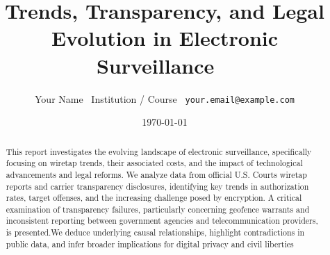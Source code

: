 \documentclass[11pt]{article}
\title{\textbf{Trends, Transparency, and Legal Evolution in Electronic Surveillance} \ \large }
\author{Your Name \
Institution / Course \
\texttt{your.email@example.com}
}
\date{\today}
\begin{document}
\maketitle

\begin{abstract}
This report investigates the evolving landscape of electronic surveillance, specifically focusing on wiretap trends, their associated costs, and the impact of technological advancements and legal reforms. We analyze data from official U.S. Courts wiretap reports and carrier transparency disclosures, identifying key trends in authorization rates, target offenses, and the increasing challenge posed by encryption. A critical examination of transparency failures, particularly concerning geofence warrants and inconsistent reporting between government agencies and telecommunication providers, is presented.We deduce underlying causal relationships, highlight contradictions in public data, and infer broader implications for digital privacy and civil liberties
\end{abstract}
\end{document}
